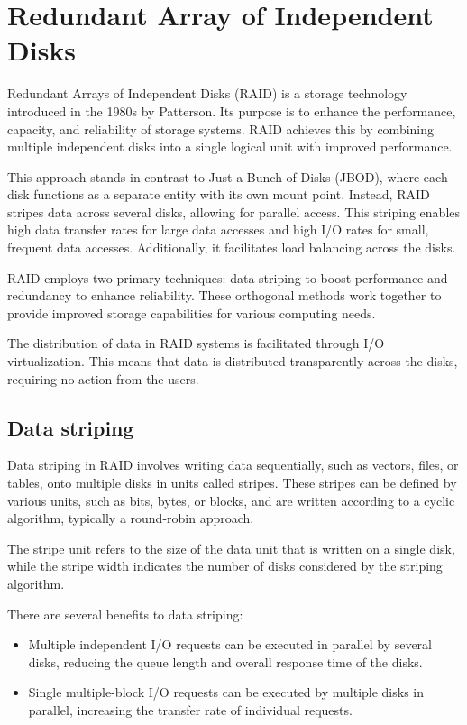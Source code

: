 \section{Redundant Array of Independent Disks}

Redundant Arrays of Independent Disks (RAID) is a storage technology introduced in the 1980s by Patterson. 
Its purpose is to enhance the performance, capacity, and reliability of storage systems. 
RAID achieves this by combining multiple independent disks into a single logical unit with improved performance.

This approach stands in contrast to Just a Bunch of Disks (JBOD), where each disk functions as a separate entity with its own mount point.
Instead, RAID stripes data across several disks, allowing for parallel access. 
This striping enables high data transfer rates for large data accesses and high I/O rates for small, frequent data accesses.
Additionally, it facilitates load balancing across the disks.

RAID employs two primary techniques: data striping to boost performance and redundancy to enhance reliability. 
These orthogonal methods work together to provide improved storage capabilities for various computing needs.

The distribution of data in RAID systems is facilitated through I/O virtualization.
This means that data is distributed transparently across the disks, requiring no action from the users. 

\subsection{Data striping}
Data striping in RAID involves writing data sequentially, such as vectors, files, or tables, onto multiple disks in units called stripes. 
These stripes can be defined by various units, such as bits, bytes, or blocks, and are written according to a cyclic algorithm, typically a round-robin approach.

The stripe unit refers to the size of the data unit that is written on a single disk, while the stripe width indicates the number of disks considered by the striping algorithm.

There are several benefits to data striping:
\begin{itemize}
    \item Multiple independent I/O requests can be executed in parallel by several disks, reducing the queue length and overall response time of the disks.
    \item Single multiple-block I/O requests can be executed by multiple disks in parallel, increasing the transfer rate of individual requests.
\end{itemize}


